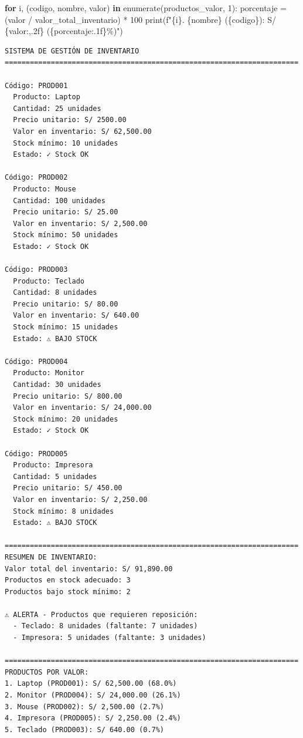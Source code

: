 \documentclass[
  doc,
  floatsintext,
  longtable,
  a4paper,
  nolmodern,
  notxfonts,
  notimes,
  12pt,
  colorlinks=true,linkcolor=blue,citecolor=blue,urlcolor=blue]{apa7}
\newenvironment{Shaded}{\begin{snugshade}}{\end{snugshade}}
\newcommand{\BuiltInTok}[1]{\textcolor[rgb]{0.00,0.23,0.31}{#1}}
\newcommand{\ControlFlowTok}[1]{\textcolor[rgb]{0.00,0.23,0.31}{\textbf{#1}}}
\newcommand{\DecValTok}[1]{\textcolor[rgb]{0.68,0.00,0.00}{#1}}
\newcommand{\KeywordTok}[1]{\textcolor[rgb]{0.00,0.23,0.31}{\textbf{#1}}}
\newcommand{\NormalTok}[1]{\textcolor[rgb]{0.00,0.23,0.31}{#1}}
\newcommand{\OperatorTok}[1]{\textcolor[rgb]{0.37,0.37,0.37}{#1}}
\newcommand{\SpecialCharTok}[1]{\textcolor[rgb]{0.37,0.37,0.37}{#1}}
\newcommand{\SpecialStringTok}[1]{\textcolor[rgb]{0.13,0.47,0.30}{#1}}
\begin{document}
\begin{Shaded}
\begin{Highlighting}[]
\ControlFlowTok{for}\NormalTok{ i, (codigo, nombre, valor) }\KeywordTok{in} \BuiltInTok{enumerate}\NormalTok{(productos\_valor, }\DecValTok{1}\NormalTok{):}
\NormalTok{    porcentaje }\OperatorTok{=}\NormalTok{ (valor }\OperatorTok{/}\NormalTok{ valor\_total\_inventario) }\OperatorTok{*} \DecValTok{100}
    \BuiltInTok{print}\NormalTok{(}\SpecialStringTok{f"}\SpecialCharTok{\{}\NormalTok{i}\SpecialCharTok{\}}\SpecialStringTok{. }\SpecialCharTok{\{}\NormalTok{nombre}\SpecialCharTok{\}}\SpecialStringTok{ (}\SpecialCharTok{\{}\NormalTok{codigo}\SpecialCharTok{\}}\SpecialStringTok{): S/ }\SpecialCharTok{\{}\NormalTok{valor}\SpecialCharTok{:,.2f\}}\SpecialStringTok{ (}\SpecialCharTok{\{}\NormalTok{porcentaje}\SpecialCharTok{:.1f\}}\SpecialStringTok{\%)"}\NormalTok{)}
\end{Highlighting}
\end{Shaded}

\begin{verbatim}
SISTEMA DE GESTIÓN DE INVENTARIO
======================================================================

Código: PROD001
  Producto: Laptop
  Cantidad: 25 unidades
  Precio unitario: S/ 2500.00
  Valor en inventario: S/ 62,500.00
  Stock mínimo: 10 unidades
  Estado: ✓ Stock OK

Código: PROD002
  Producto: Mouse
  Cantidad: 100 unidades
  Precio unitario: S/ 25.00
  Valor en inventario: S/ 2,500.00
  Stock mínimo: 50 unidades
  Estado: ✓ Stock OK

Código: PROD003
  Producto: Teclado
  Cantidad: 8 unidades
  Precio unitario: S/ 80.00
  Valor en inventario: S/ 640.00
  Stock mínimo: 15 unidades
  Estado: ⚠️ BAJO STOCK

Código: PROD004
  Producto: Monitor
  Cantidad: 30 unidades
  Precio unitario: S/ 800.00
  Valor en inventario: S/ 24,000.00
  Stock mínimo: 20 unidades
  Estado: ✓ Stock OK

Código: PROD005
  Producto: Impresora
  Cantidad: 5 unidades
  Precio unitario: S/ 450.00
  Valor en inventario: S/ 2,250.00
  Stock mínimo: 8 unidades
  Estado: ⚠️ BAJO STOCK

======================================================================
RESUMEN DE INVENTARIO:
Valor total del inventario: S/ 91,890.00
Productos en stock adecuado: 3
Productos bajo stock mínimo: 2

⚠️ ALERTA - Productos que requieren reposición:
  - Teclado: 8 unidades (faltante: 7 unidades)
  - Impresora: 5 unidades (faltante: 3 unidades)

======================================================================
PRODUCTOS POR VALOR:
1. Laptop (PROD001): S/ 62,500.00 (68.0%)
2. Monitor (PROD004): S/ 24,000.00 (26.1%)
3. Mouse (PROD002): S/ 2,500.00 (2.7%)
4. Impresora (PROD005): S/ 2,250.00 (2.4%)
5. Teclado (PROD003): S/ 640.00 (0.7%)
\end{verbatim}
\end{document}
